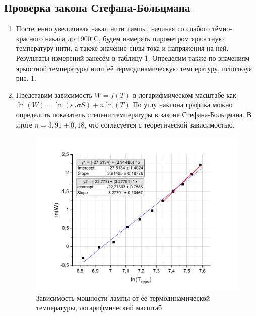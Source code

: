 \documentclass[a4paper, 12pt]{article}
\begin{document}
\subsection{Проверка закона Стефана-Больцмана}
\begin{enumerate}
    \item Постепенно увеличивая накал нити лампы, начиная со слабого тёмно-красного накала до 1900$^{\circ}$C, будем измерять пирометром яркостную температуру нити, а также значение силы тока и напряжения на ней. Результаты измерений занесём в таблицу 1. Определим также по значениям яркостной температуры нити её термодинамическую температуру, используя рис. 1.

\item Представим зависимость $W=f(T)$ в логарифмическом масштабе как $\ln(W) = \ln(\varepsilon_T \sigma S) + n \ln(T)$ По углу наклона графика можно определить показатель степени температуры в законе Стефана-Больцмана. В итоге $n = 3,91 \pm 0,18$, что согласуется с теоретической зависимостью.

\begin{figure}[h]
    \centering
    \includegraphics[width=\textwidth]{W_T.png}
    \caption{Зависимость мощности лампы от её термодинамической температуры, логарифмический масштаб}
    \label{fig:vac}
\end{figure}


\end{enumerate}
\end{document}
